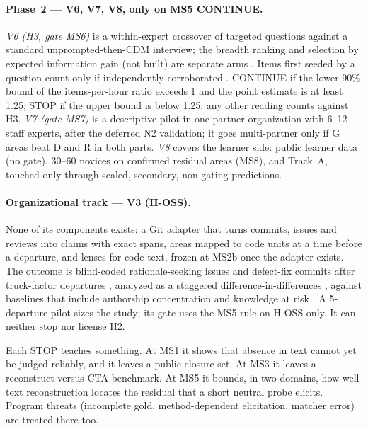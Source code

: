 \paragraph{Phase~2 --- V6, V7, V8, only on MS5 CONTINUE.} \evfut{} \emph{V6 (H3, gate MS6)} is a
within-expert crossover of targeted questions against a standard unprompted-then-CDM interview; the
breadth ranking and selection by expected information gain (not built) are separate arms
\parencite{lindley1956measure}. Items first seeded by a question count only if independently
corroborated \parencite{loftus1975leading}. CONTINUE if the lower 90\% bound of the items-per-hour ratio
exceeds 1 and the point estimate is at least 1.25; STOP if the upper bound is below 1.25; any other reading
counts against H3. \emph{V7 (gate MS7)} is a descriptive pilot in one partner organization with 6--12
staff experts, after the deferred N2 validation; it goes multi-partner only if G areas beat D and R in
both parts. \emph{V8} covers the learner side: public learner data (no gate), 30--60 novices on confirmed
residual areas (MS8), and Track~A, touched only through sealed, secondary, non-gating predictions.

\paragraph{Organizational track --- V3 (H-OSS).} \evfut{} None of its components exists: a Git adapter
that turns commits, issues and reviews into claims with exact spans, areas mapped to code units at a
time before a departure, and lenses for code text, frozen at MS2b once the adapter exists. The outcome is
blind-coded rationale-seeking issues and defect-fix commits after truck-factor departures
\parencite{avelino2016novel}, analyzed as a staggered difference-in-differences
\parencite{callaway2021difference}, against baselines that include authorship concentration and knowledge
at risk \parencite{rigby2016quantifying}. A 5-departure pilot sizes the study; its gate uses the MS5 rule
on H-OSS only. It can neither stop nor license H2.


\evint{} Each STOP teaches something. At MS1 it shows that absence in text cannot yet be judged
reliably, and it leaves a public closure set. At MS3 it leaves a reconstruct-versus-CTA benchmark. At
MS5 it bounds, in two domains, how well text reconstruction locates the residual that a short neutral
probe elicits. Program threats (incomplete gold, method-dependent elicitation, matcher error) are treated
there too.
